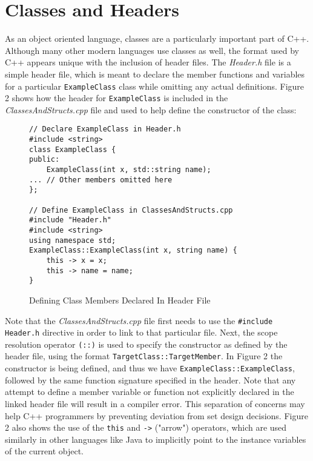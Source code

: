 \documentclass[11pt]{article}
\begin{document}
\section{Classes and Headers}

	As an object oriented language, classes are a particularly important part of C++.  Although many other modern languages use classes as well, the format used by C++ appears unique with the inclusion of header files.  The \textit{Header.h} file is a simple header file, which is meant to declare the member functions and variables for a particular \texttt{ExampleClass} class while omitting any actual definitions.  Figure 2 shows how the header for \texttt{ExampleClass} is included in the \textit{ClassesAndStructs.cpp} file and used to help define the constructor of the class: 
	
\begin{figure}[!h]
\centering
\begin{BVerbatim}
// Declare ExampleClass in Header.h
#include <string>
class ExampleClass {
public:
	ExampleClass(int x, std::string name);
... // Other members omitted here
};

// Define ExampleClass in ClassesAndStructs.cpp
#include "Header.h"
#include <string>
using namespace std;
ExampleClass::ExampleClass(int x, string name) {
	this -> x = x;
	this -> name = name;
}
\end{BVerbatim}
\caption{Defining Class Members Declared In Header File}
\end{figure} \FloatBarrier \FloatBarrier

\noindent
Note that the \textit{ClassesAndStructs.cpp} file first needs to use the \texttt{\#include Header.h} directive in order to link to that particular file.  Next, the scope resolution operator \texttt{(::)} is used to specify the constructor as defined by the header file, using the format \texttt{TargetClass::TargetMember}.  In Figure 2 the constructor is being defined, and thus we have \texttt{ExampleClass::ExampleClass}, followed by the same function signature specified in the header.  Note that any attempt to define a member variable or function not explicitly declared in the linked header file will result in a compiler error.  This separation of concerns may help C++ programmers by preventing deviation from set design decisions.  Figure 2 also shows the use of the \texttt{this} and \texttt{->} ("arrow") operators, which are used similarly in other languages like Java to implicitly point to the instance variables of the current object.
	
\end{document}
